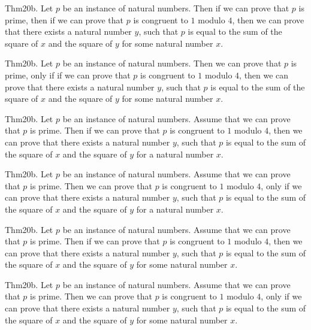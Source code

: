 \documentclass{article}
\begin{document}
Thm20b. Let $p$ be an instance of natural numbers. Then if we can prove that $p$ is prime, then if we can prove that $p$ is congruent to $1$ modulo $4$, then we can prove that there exists a natural number $y$, such that $p$ is equal to the sum of the square of $x$ and the square of $y$ for some natural number $x$.

Thm20b. Let $p$ be an instance of natural numbers. Then we can prove that $p$ is prime, only if if we can prove that $p$ is congruent to $1$ modulo $4$, then we can prove that there exists a natural number $y$, such that $p$ is equal to the sum of the square of $x$ and the square of $y$ for some natural number $x$.

Thm20b. Let $p$ be an instance of natural numbers. Assume that we can prove that $p$ is prime. Then if we can prove that $p$ is congruent to $1$ modulo $4$, then we can prove that there exists a natural number $y$, such that $p$ is equal to the sum of the square of $x$ and the square of $y$ for a natural number $x$.

Thm20b. Let $p$ be an instance of natural numbers. Assume that we can prove that $p$ is prime. Then we can prove that $p$ is congruent to $1$ modulo $4$, only if we can prove that there exists a natural number $y$, such that $p$ is equal to the sum of the square of $x$ and the square of $y$ for a natural number $x$.

Thm20b. Let $p$ be an instance of natural numbers. Assume that we can prove that $p$ is prime. Then if we can prove that $p$ is congruent to $1$ modulo $4$, then we can prove that there exists a natural number $y$, such that $p$ is equal to the sum of the square of $x$ and the square of $y$ for some natural number $x$.

Thm20b. Let $p$ be an instance of natural numbers. Assume that we can prove that $p$ is prime. Then we can prove that $p$ is congruent to $1$ modulo $4$, only if we can prove that there exists a natural number $y$, such that $p$ is equal to the sum of the square of $x$ and the square of $y$ for some natural number $x$.
\end{document}
